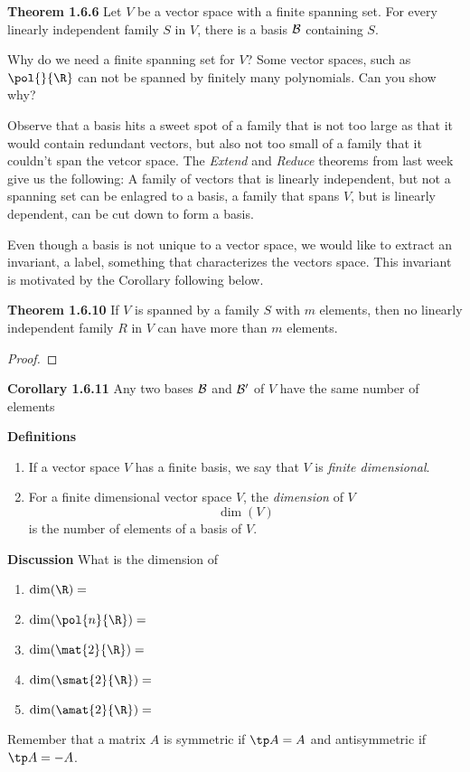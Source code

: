 \documentclass[letterpaper, 10pt]{article}
\begin{document}
\lb
\textbf{Theorem 1.6.6} 
\lb
Let $V$ be a vector space with a finite spanning set.
For every linearly independent family $S$ in $V$, there
is a basis $\cal B$ containing $S$.

\lb
Why do we need a finite spanning set for $V$? Some vector spaces, such as
$\pol{}{\R}$ can not be spanned by finitely many polynomials.
Can you show why?


\lb
Observe that a basis hits a sweet spot of a family that is not too
large as that it would contain redundant vectors, but also not too
small of a family that it couldn't span the vetcor space.
\pr
The \emph{Extend} and \emph{Reduce} theorems from last week
give us the following:
\lb
A family of vectors that is linearly independent, but not a spanning set can
be enlagred to a basis, a family that spans $V$, but is linearly
dependent, can be cut down to form a basis.


\newpage
\lb
Even though a basis is not unique to a vector space, we would like to extract
an invariant, a label, something that characterizes the vectors space.
This invariant is motivated by the Corollary following below.

\lb
\textbf{Theorem 1.6.10} 
\lb
If $V$ is spanned by a family $S$ with $m$ elements, then no linearly
independent family $R$ in $V$ can have more than $m$ elements.
\begin{proof}
    
\end{proof}


\lb
\textbf{Corollary 1.6.11}
\lb
Any two bases $\cal B$ and $\cal B'$ of $V$ have the same number of elements



\lb
\textbf{Definitions} 
\begin{enumerate}
    \item If a vector space $V$ has a finite basis, we say that $V$ is
        \emph{finite dimensional}.
    \item For a finite dimensional vector space $V$, the \emph{dimension}
        of $V$
        \[ \dim(V) \]
        is the number of elements of a basis of $V$.
\end{enumerate}



\lb
\textbf{Discussion} 
\lb
What is the dimension of 
\begin{enumerate}
    \item[] $\dim( \R ) = $
    \item[] $\dim( \pol{n}{\R} ) = $
    \item[] $\dim( \mat{2}{\R} ) = $
    \item[] $\dim( \smat{2}{\R} ) = $
    \item[] $\dim( \amat{2}{\R} ) = $
\end{enumerate}
\lb
Remember that a matrix $A$ is symmetric if $\tp A = A$ and antisymmetric if $\tp A = -A$.
\end{document}

